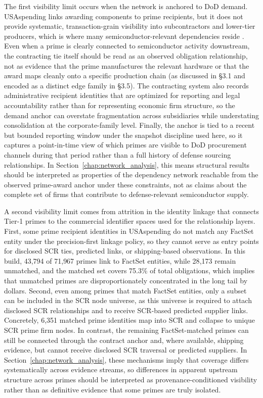 The first visibility limit occurs when the network is anchored to DoD demand. USAspending links awarding components to prime recipients, but it does not provide systematic, transaction-grain visibility into subcontractors and lower-tier producers, which is where many semiconductor-relevant dependencies reside \parencite{U.S.GovernmentAccountabilityOffice2025}. Even when a prime is clearly connected to semiconductor activity downstream, the contracting tie itself should be read as an observed obligation relationship, not as evidence that the prime manufactures the relevant hardware or that the award maps cleanly onto a specific production chain (as discussed in \S3.1 and encoded as a distinct edge family in \S3.5). The contracting system also records administrative recipient identities that are optimized for reporting and legal accountability rather than for representing economic firm structure, so the demand anchor can overstate fragmentation across subsidiaries while understating consolidation at the corporate-family level. Finally, the anchor is tied to a recent but bounded reporting window under the snapshot discipline used here, so it captures a point-in-time view of which primes are visible to DoD procurement channels during that period rather than a full history of defense sourcing relationships. In Section~\ref{chap:network_analysis}, this means structural results should be interpreted as properties of the dependency network reachable from the observed prime-award anchor under these constraints, not as claims about the complete set of firms that contribute to defense-relevant semiconductor supply.

A second visibility limit comes from attrition in the identity linkage that connects Tier-1 primes to the commercial identifier spaces used for the relationship layers. First, some prime recipient identities in USAspending do not match any FactSet entity under the precision-first linkage policy, so they cannot serve as entry points for disclosed SCR ties, predicted links, or shipping-based observations. In this build, 43{,}794 of 71{,}967 primes link to FactSet entities, while 28{,}173 remain unmatched, and the matched set covers 75.3\% of total obligations, which implies that unmatched primes are disproportionately concentrated in the long tail by dollars. Second, even among primes that match FactSet entities, only a subset can be included in the SCR node universe, as this universe is required to attach disclosed SCR relationships and to receive SCR-based predicted supplier links. Concretely, 6{,}351 matched prime identities map into SCR and collapse to \NumPrimes unique SCR prime firm nodes. In contrast, the remaining FactSet-matched primes can still be connected through the contract anchor and, where available, shipping evidence, but cannot receive disclosed SCR traversal or predicted suppliers. In Section~\ref{chap:network_analysis}, these mechanisms imply that coverage differs systematically across evidence streams, so differences in apparent upstream structure across primes should be interpreted as provenance-conditioned visibility rather than as definitive evidence that some primes are truly isolated.

